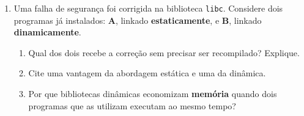 \documentclass[11pt, a4paper]{article}
\begin{document}
\begin{enumerate}
\item Uma falha de seguran\c{c}a foi corrigida na biblioteca \texttt{libc}. Considere dois programas j\'{a} instalados: \textbf{A}, linkado \textbf{estaticamente}, e \textbf{B}, linkado \textbf{dinamicamente}.
\begin{enumerate}
  \item Qual dos dois recebe a corre\c{c}\~{a}o sem precisar ser recompilado? Explique.
  \item Cite uma vantagem da abordagem est\'{a}tica e uma da din\^{a}mica.
  \item Por que bibliotecas din\^{a}micas economizam \textbf{mem\'{o}ria} quando dois programas que as utilizam executam ao mesmo tempo?
\end{enumerate}

\end{enumerate}
\end{document}
